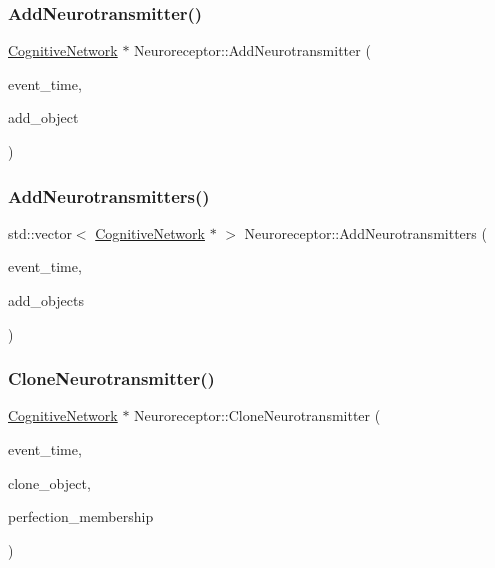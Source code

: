 \subsubsection{\texorpdfstring{Add\+Neurotransmitter()}{AddNeurotransmitter()}}
{\footnotesize\ttfamily \mbox{\hyperlink{classCognitiveNetwork}{Cognitive\+Network}} $\ast$ Neuroreceptor\+::\+Add\+Neurotransmitter (\begin{DoxyParamCaption}\item[{std\+::chrono\+::time\+\_\+point$<$ \mbox{\hyperlink{universe_8h_a0ef8d951d1ca5ab3cfaf7ab4c7a6fd80}{Clock}} $>$}]{event\+\_\+time,  }\item[{\mbox{\hyperlink{classCognitiveNetwork}{Cognitive\+Network}} $\ast$}]{add\+\_\+object }\end{DoxyParamCaption})}

\mbox{\label{classNeuroreceptor_a2e4cbd9debd555091923f57f8aa11fe4}} 
\subsubsection{\texorpdfstring{Add\+Neurotransmitters()}{AddNeurotransmitters()}}
{\footnotesize\ttfamily std\+::vector$<$ \mbox{\hyperlink{classCognitiveNetwork}{Cognitive\+Network}} $\ast$ $>$ Neuroreceptor\+::\+Add\+Neurotransmitters (\begin{DoxyParamCaption}\item[{std\+::chrono\+::time\+\_\+point$<$ \mbox{\hyperlink{universe_8h_a0ef8d951d1ca5ab3cfaf7ab4c7a6fd80}{Clock}} $>$}]{event\+\_\+time,  }\item[{std\+::vector$<$ \mbox{\hyperlink{classCognitiveNetwork}{Cognitive\+Network}} $\ast$$>$}]{add\+\_\+objects }\end{DoxyParamCaption})}

\mbox{\label{classNeuroreceptor_a5629a3d463cc963138ff017ec499720d}} 
\subsubsection{\texorpdfstring{Clone\+Neurotransmitter()}{CloneNeurotransmitter()}}
{\footnotesize\ttfamily \mbox{\hyperlink{classCognitiveNetwork}{Cognitive\+Network}} $\ast$ Neuroreceptor\+::\+Clone\+Neurotransmitter (\begin{DoxyParamCaption}\item[{std\+::chrono\+::time\+\_\+point$<$ \mbox{\hyperlink{universe_8h_a0ef8d951d1ca5ab3cfaf7ab4c7a6fd80}{Clock}} $>$}]{event\+\_\+time,  }\item[{\mbox{\hyperlink{classCognitiveNetwork}{Cognitive\+Network}} $\ast$}]{clone\+\_\+object,  }\item[{double}]{perfection\+\_\+membership }\end{DoxyParamCaption})}

